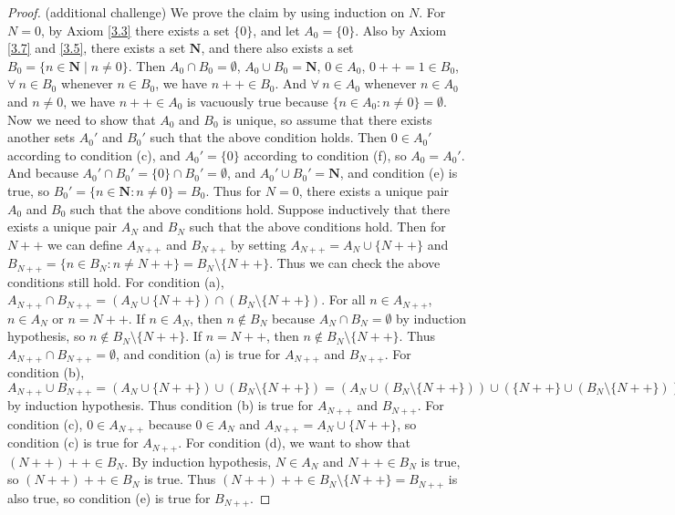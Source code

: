 \begin{proof}{(additional challenge)}
We prove the claim by using induction on \(N\).
For \(N = 0\), by Axiom \ref{3.3} there exists a set \(\{0\}\), and let \(A_0 = \{0\}\).
Also by Axiom \ref{3.7} and \ref{3.5}, there exists a set \(\mathbf{N}\), and there also exists a set \(B_0 = \{n \in \mathbf{N} \mid n \neq 0\}\).
Then \(A_0 \cap B_0 = \emptyset\), \(A_0 \cup B_0 = \mathbf{N}\), \(0 \in A_0\), \(0++ = 1 \in B_0\), \(\forall\ n \in B_0\) whenever \(n \in B_0\), we have \(n++ \in B_0\).
And \(\forall\ n \in A_0\) whenever \(n \in A_0\) and \(n \neq 0\), we have \(n++ \in A_0\) is vacuously true because \(\{n \in A_0 : n \neq 0\} = \emptyset\).
Now we need to show that \(A_0\) and \(B_0\) is unique, so assume that there exists another sets \(A_0'\) and \(B_0'\) such that the above condition holds.
Then \(0 \in A_0'\) according to condition (c), and \(A_0' = \{0\}\) according to condition (f), so \(A_0 = A_0'\).
And because \(A_0' \cap B_0' = \{0\} \cap B_0' = \emptyset\), and \(A_0' \cup B_0' = \mathbf{N}\), and condition (e) is true, so \(B_0' = \{n \in \mathbf{N} : n \neq 0\} = B_0\).
Thus for \(N = 0\), there exists a unique pair \(A_0\) and \(B_0\) such that the above conditions hold.
Suppose inductively that there exists a unique pair \(A_N\) and \(B_N\) such that the above conditions hold.
Then for \(N++\) we can define \(A_{N++}\) and \(B_{N++}\) by setting \(A_{N++} = A_N \cup \{N++\}\) and \(B_{N++} = \{n \in B_N : n \neq N++\} = B_N \setminus \{N++\}\).
Thus we can check the above conditions still hold.
For condition (a), \(A_{N++} \cap B_{N++} = (A_N \cup \{N++\}) \cap (B_N \setminus \{N++\})\).
For all \(n \in A_{N++}\), \(n \in A_N\) or \(n = N++\).
If \(n \in A_N\), then \(n \notin B_N\) because \(A_N \cap B_N = \emptyset\) by induction hypothesis, so \(n \notin B_N \setminus \{N++\}\).
If \(n = N++\), then \(n \notin B_N \setminus \{N++\}\).
Thus \(A_{N++} \cap B_{N++} = \emptyset\), and condition (a) is true for \(A_{N++}\) and \(B_{N++}\).
For condition (b), \(A_{N++} \cup B_{N++} = (A_N \cup \{N++\}) \cup (B_N \setminus \{N++\}) = (A_N \cup (B_N \setminus \{N++\})) \cup (\{N++\} \cup (B_N \setminus \{N++\})) = (A_N \cup (B_N \setminus \{N++\})) \cup B_N = A_N \cup B_N = \mathbf{N}\) by induction hypothesis.
Thus condition (b) is true for \(A_{N++}\) and \(B_{N++}\).
For condition (c), \(0 \in A_{N++}\) because \(0 \in A_N\) and \(A_{N++} = A_N \cup \{N++\}\), so condition (c) is true for \(A_{N++}\).
For condition (d), we want to show that \((N++)++ \in B_N\).
By induction hypothesis, \(N \in A_N\) and \(N++ \in B_N\) is true, so \((N++)++ \in B_N\) is true.
Thus \((N++)++ \in B_N \setminus \{N++\} = B_{N++}\) is also true, so condition (e) is true for \(B_{N++}\).

\end{proof}
